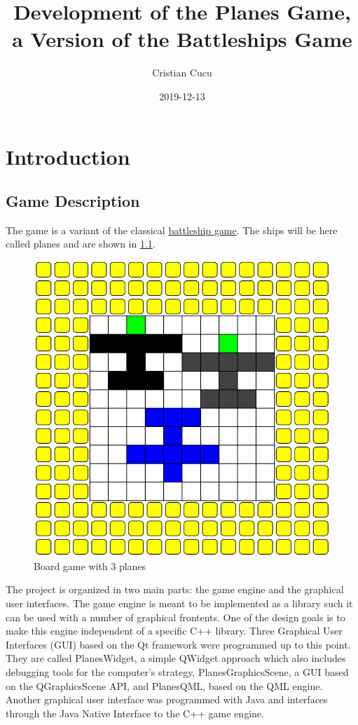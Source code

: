\documentclass{report}
\title{Development of the Planes Game, a Version of the Battleships Game}
\date{2019-12-13}
\author{Cristian Cucu}
\begin{document}
\maketitle
\newpage
\lstset{language=C++}
\tableofcontents{}

\chapter{Introduction}

\section{Game Description}
The game is a variant of the classical \href{https://en.wikipedia.org/wiki/Battleship_(game)}{battleship game}. The ships will be here called planes and are shown in \ref{fig:board}.
\begin{figure}[h]
  \includegraphics[width = \textwidth]{BoardWithPlanes.png}
  \caption{Board game with 3 planes}
  \label{fig:board}
\end{figure}
The project is organized in two main parts: the game engine and the graphical user interfaces. The game engine is meant to be implemented as a library such it can be used with a number of graphical frontents. One of the design goals is to make this engine independent of a specific C++ library. Three Graphical User Interfaces (GUI) based on the Qt framework were programmed up to this point. They are called PlanesWidget, a simple QWidget approach which also includes debugging tools for the computer's strategy, PlanesGraphicsScene, a GUI based on the QGraphicsScene API, and PlanesQML, based on the QML engine. Another graphical user interface was programmed with Java and interfaces through the Java Native Interface to the C++ game engine.
\end{document}
